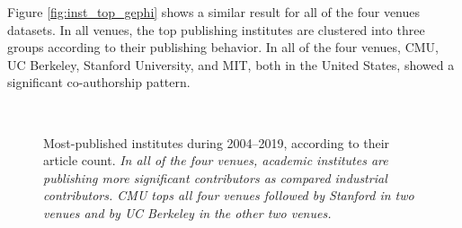 Figure \ref{fig:inst_top_gephi} shows a similar result for all of the four venues datasets. In all venues, the top publishing institutes are clustered into three groups according to their publishing behavior. In all of the four venues, CMU, UC Berkeley, Stanford University, and MIT, both in the United States, showed a significant co-authorship pattern. 



\begin{figure}[!htbp]
	\begin{center}
	\\
	\end{center}
	\caption{Most-published institutes during 2004--2019, according to their article count. \textit{In all of the four venues, academic institutes are publishing more significant contributors as compared industrial contributors. CMU tops all four venues followed by Stanford in two venues and by UC Berkeley in the other two venues.}}
	\label{fig:inst_top}
\end{figure}



